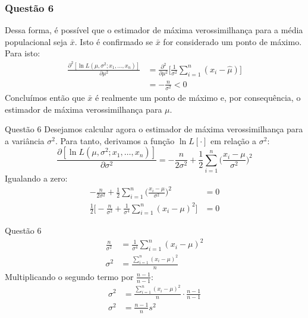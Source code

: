\documentclass{beamer}\usepackage[]{graphicx}\usepackage[]{color}
\begin{document}
		\begin{frame}
			\frametitle{Questão 6}
			Dessa forma, é possível que o estimador de máxima verossimilhança para a média populacional seja $\bar{x}$.  Isto é confirmado se $\bar{x}$ for considerado um ponto de máximo.  Para isto:
			\begin{align*}
				\frac{\partial^{2}[ \ln   L(\mu,\sigma^{2};x_{1},\dots,x_{n})]}{\partial \mu^{2}} &= \frac{\partial^{2}}{\partial \mu^{2}} \bigg[ \frac{1}{\sigma^{2}}\sum_{i=1}^{n}(x_{i}-\hat{\mu})\bigg]\\
				&= -\frac{n}{\sigma^{2}} < 0
			\end{align*}
			Concluímos então que $\bar{x}$ é realmente um ponto de máximo e, por consequência, o estimador de máxima verossimilhança para $\mu$.
		\end{frame}
	
		\begin{frame}{Questão 6}
			Desejamos calcular agora o estimador de máxima verossimilhança para a variância $\sigma^{2}$.  Para tanto, derivamos a função $\ln L[\cdot]$ em relação a $\sigma^{2}$:
			$$\frac{\partial  [ \ln L(\mu,\sigma^{2};x_{1},\dots,x_{n})]}{\partial \sigma^{2}} = -\frac{n}{2\sigma^{2}}+\frac{1}{2}\sum_{i=1}^{n}\bigg(\frac{x_{i}-\mu}{\sigma^{2}}\bigg)^{2}$$
			Igualando a zero:
			\begin{align*}
				-\frac{n}{2\sigma^{2}}+\frac{1}{2}\sum_{i=1}^{n}\bigg(\frac{x_{i}-\mu}{\sigma^{2}}\bigg)^{2} &= 0\\
				\frac{1}{2}\bigg[ -\frac{n}{\sigma^{2}} + \frac{1}{\sigma^{4}}\sum_{i=1}^{n}(x_{i}-\mu)^{2}\bigg] &= 0 
			\end{align*}
		\end{frame}
		
		\begin{frame}{Questão 6}
			\begin{align*}
				\frac{n}{\sigma^{2}} &= \frac{1}{\sigma^{4}}\sum_{i=1}^{n}(x_{i}-\mu)^{2}\\
				\sigma^{2} &= \frac{\sum_{i=1}^{n}(x_{i}-\mu)^{2}}{n}				
			\end{align*}
			Multiplicando o segundo termo por $\frac{n-1}{n-1}$:
			\begin{align*}
			\sigma^{2} &= \frac{\sum_{i=1}^{n}(x_{i}-\mu)^{2}}{n} \cdot \frac{n-1}{n-1}\\
			\sigma^{2} &= \frac{n-1}{n}s^{2}\\				
			\end{align*}
		\end{frame}
	
\end{document}
